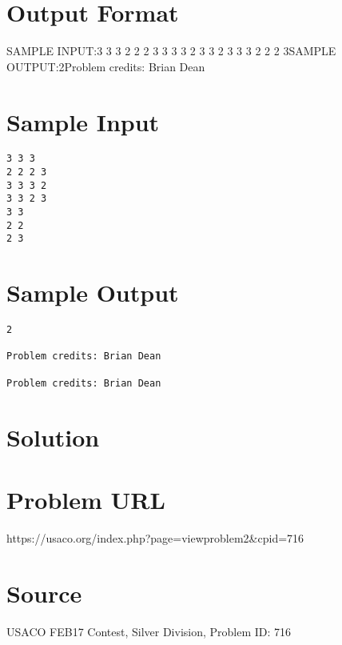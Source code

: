 \documentclass[12pt]{article}
\begin{document}
\section*{Output Format}
SAMPLE INPUT:3 3 3
2 2 2 3
3 3 3 2
3 3 2 3
3 3
2 2
2 3SAMPLE OUTPUT:2Problem credits: Brian Dean

\section*{Sample Input}
\begin{verbatim}
3 3 3
2 2 2 3
3 3 3 2
3 3 2 3
3 3
2 2
2 3
\end{verbatim}

\section*{Sample Output}
\begin{verbatim}
2

Problem credits: Brian Dean

Problem credits: Brian Dean
\end{verbatim}

\section*{Solution}


\section*{Problem URL}
https://usaco.org/index.php?page=viewproblem2&cpid=716

\section*{Source}
USACO FEB17 Contest, Silver Division, Problem ID: 716
\end{document}
